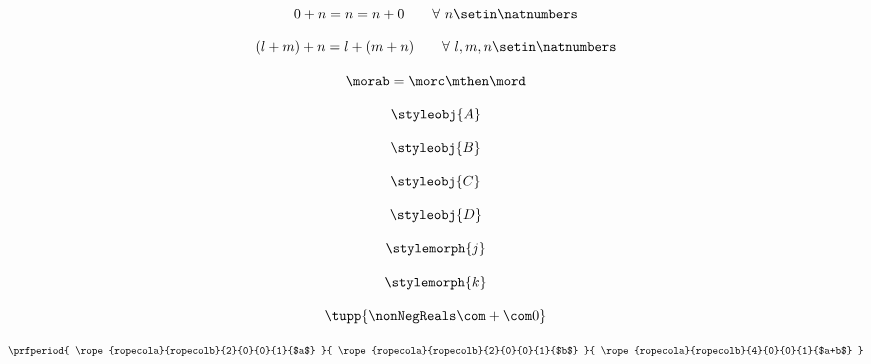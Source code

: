 \begin{forslides}
    \begin{equation}
        \label{eq:semicats-slides-44}
        0 + n = n = n + 0   \quad \quad \forall \ n \setin \natnumbers
    \end{equation}

    \begin{equation}
        \label{eq:semicats-slides-45}
        (l + m) + n = l + (m + n) \quad \quad  \forall \ l, m, n \setin \natnumbers
    \end{equation}

    \begin{equation}
        \label{eq:semicats-slides-46}
        \morab = \morc \mthen \mord
    \end{equation}

    \begin{equation}
        \label{eq:semicats-slides-47}
        \styleobj{A}
    \end{equation}

    \begin{equation}
        \label{eq:semicats-slides-48}
        \styleobj{B}
    \end{equation}

    \begin{equation}
        \label{eq:4semicats-slides-9}
        \styleobj{C}
    \end{equation}

    \begin{equation}
        \label{eq:semicats-slides-50}
        \styleobj{D}
    \end{equation}

    \begin{equation}
        \label{eq:semicats-slides-51}
        \stylemorph{j}
    \end{equation}

    \begin{equation}
        \label{eq:semicats-slides-52}
        \stylemorph{k}
    \end{equation}

    \begin{equation}
        \label{eq:semicats-slides-53a}
        \tupp{\nonNegReals \com + \com 0}
    \end{equation}

    \begin{equation}
        \label{eq:semicats-slides-53b}
        \prfperiod{
            \rope{ropecola}{ropecolb}{2}{0}{0}{1}{$a$}
        }{
            \rope{ropecola}{ropecolb}{2}{0}{0}{1}{$b$}
        }{
            \rope{ropecola}{ropecolb}{4}{0}{0}{1}{$a+b$}
        }
    \end{equation}


\end{forslides}
